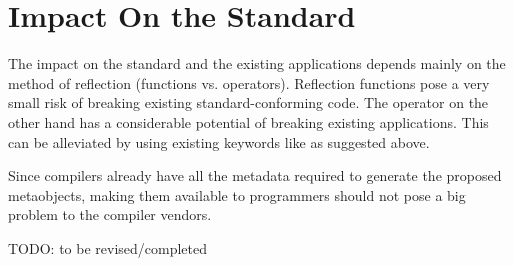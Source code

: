 \section{Impact On the Standard}

The impact on the standard and the existing applications depends
mainly on the method of reflection (functions vs. operators).
Reflection functions pose a very small risk of breaking existing
standard-conforming code. The \verb@mirrored@ operator on the other
hand has a considerable potential of breaking existing applications.
This can be alleviated by using existing keywords like \verb@%@
as suggested above.

Since compilers already have all the metadata required to generate
the proposed metaobjects, making them available to programmers
should not pose a big problem to the compiler vendors.

TODO: to be revised/completed
